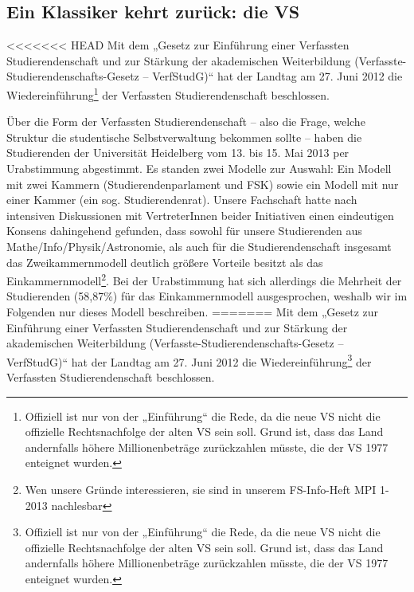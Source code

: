 \subsection{Ein Klassiker kehrt zurück: die VS}

<<<<<<< HEAD
Mit dem „Gesetz zur Einführung einer Verfassten Studierendenschaft und zur
Stärkung der akademischen Weiterbildung
(Ver\-fass\-te-Stu\-dier\-en\-den\-schafts-Ge\-setz -- VerfStudG)“ hat der
Landtag am 27. Juni 2012 die Wiedereinführung\footnote{Offiziell ist nur von
der „Einführung“ die Rede, da die neue VS nicht die offizielle Rechtsnachfolge
der alten VS sein soll.  Grund ist, dass das Land andernfalls höhere
Millionenbeträge zurückzahlen müsste, die der VS 1977 enteignet wurden.} der
Verfassten Studierendenschaft beschlossen.

Über die Form der Verfassten Studierendenschaft -- also die Frage, welche
Struktur die studentische Selbstverwaltung bekommen sollte -- haben die
Studierenden der Universität Heidelberg vom 13. bis 15. Mai 2013 per
Urabstimmung abgestimmt.  Es standen zwei Modelle zur Auswahl: Ein Modell mit
zwei Kammern (Studierendenparlament und FSK) sowie ein Modell mit nur einer
Kammer (ein sog. Studierendenrat). Unsere Fachschaft hatte nach intensiven
Diskussionen mit VertreterInnen beider Initiativen einen eindeutigen Konsens
dahingehend gefunden, dass sowohl für unsere Studierenden aus
Mathe/Info/Physik/Astronomie, als auch für die Studierendenschaft insgesamt das
Zweikammernmodell deutlich größere Vorteile besitzt als das
Einkammernmodell\footnote{Wen unsere Gründe interessieren, sie sind in unserem
FS-Info-Heft MPI 1-2013 nachlesbar}.  Bei der Urabstimmung hat sich allerdings
die Mehrheit der Studierenden (58,87\%) für das Einkammernmodell ausgesprochen,
weshalb wir im Folgenden nur dieses Modell beschreiben.
=======
Mit dem „Gesetz zur Einführung einer Verfassten Studierendenschaft und
zur Stärkung der akademischen Weiterbildung
(Ver\-fass\-te-Stu\-dier\-en\-den\-schafts-Ge\-setz -- VerfStudG)“ hat der Landtag am 27. Juni 2012
die Wiedereinführung\footnote{Offiziell ist nur von der „Einführung“ die
Rede, da die neue VS nicht die offizielle Rechtsnachfolge der alten VS sein soll.
Grund ist, dass das Land andernfalls höhere Millionenbeträge zurückzahlen müsste,
die der VS 1977 enteignet wurden.} der Verfassten Studierendenschaft beschlossen.

